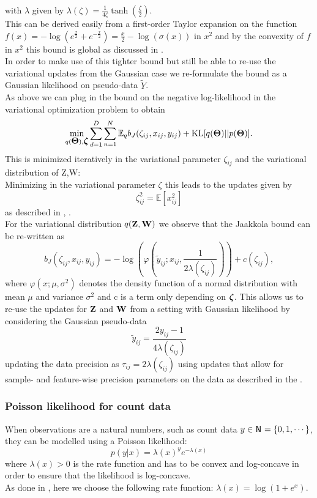 \documentclass[10pt, a4paper,openany]{report}
\begin{document}
with $\lambda$ given by $\lambda(\zeta)=\frac{1}{4\zeta}\tanh\left(\frac{\zeta}{2}\right)$.\\
This can be derived easily from a first-order Taylor expansion on the function $f(x) = - \log(e^{\frac{x}{2}}+e^{-\frac{x}{2}}) = \frac{x}{2}-\log(\sigma(x))$ in $x^2$ and by the convexity of 
$f$ in $x^2$ this bound is global as discussed in \cite{Jaakkola}.\\
In order to make use of this tighter bound but still be able to re-use the variational updates from the Gaussian case we re-formulate the bound as a Gaussian likelihood on pseudo-data $\tilde{Y}$.\\
As above we can plug in the bound on the negative log-likelihood in the variational optimization problem to obtain  \[
\min_{q(\mbox{\boldmath $\Theta$}),\mbox{\boldmath $\zeta$}} \sum_{d=1}^{D}\sum_{n=1}^{N} \mathbb{E}_q b_J(\zeta_{ij}, x_{ij},y_{ij} ) + {\rm KL}[q(\mbox{\boldmath $\Theta$})||p(\mbox{\boldmath $\Theta$})].
\]
This is minimized iteratively in the variational parameter $\zeta_{ij}$ and the variational distribution of Z,W:\\
Minimizing in the variational parameter $\zeta$ this leads to the updates given by
\begin{equation*}
\zeta_{ij}^2 = \mathbb{E}[x_{ij}^2]
\end{equation*}
as described in \cite{Jaakkola}, \cite{bishop2006pattern}.\\
For the variational distribution $q({\bf Z},{\bf W})$ we observe that the Jaakkola bound can be re-written as 
\begin{equation*}
b_J(\zeta_{ij}, x_{ij},y_{ij} ) = -\log\left(\varphi\left(\tilde{y}_{ij}; x_{ij}, \frac{1}{2\lambda(\zeta_{ij})}\right)\right) + c(\zeta_{ij}),
\end{equation*}
where $\varphi(x; \mu, \sigma^2)$ denotes the density function of a normal distribution with mean $\mu$ and variance $\sigma^2$ and c is a term only depending on $\mbox{\boldmath $\zeta$}$. This allows us to re-use the updates for ${\bf Z}$ and ${\bf W}$ from a setting with Gaussian likelihood by considering the Gaussian pseudo-data 
\begin{equation*}
\tilde{y}_{ij}= \frac{2y_{ij}-1}{4 \lambda(\zeta_{ij})}
\end{equation*}
updating the data precision as $\tau_{ij} = 2\lambda(\zeta_{ij})$ using updates that allow for sample- and feature-wise precision parameters on the data as described in the .


\subsubsection{Poisson likelihood for count data}
When observations are a natural numbers, such as count data $y \in \N = \{0,1,\cdots\}$, they can be modelled using a Poisson likelihood:
\[
p(y|x) = \lambda(x)^y e^{-\lambda(x)}
\]
where $\lambda(x)>0$ is the rate function and has to be convex and log-concave in order to ensure that the likelihood is log-concave.\\
As done in \cite{seeger}, here we choose the following rate function: $\lambda(x)=\log(1+e^x)$.
\end{document}
